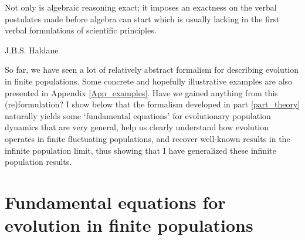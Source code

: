 \epigraph{\justifying Not only is algebraic reasoning exact; it imposes an exactness on the verbal postulates made before algebra can start which is usually lacking in the first verbal formulations of scientific principles.}{J.B.S. Haldane~\citep{haldane_defense_1964}}

So far, we have seen a lot of relatively abstract formalism for describing evolution in finite populations. Some concrete and hopefully illustrative examples are also presented in Appendix \ref{App_examples}. Have we gained anything from this (re)formulation? I show below that the formalism developed in part \ref{part_theory} naturally yields some `fundamental equations' for evolutionary population dynamics that are very general, help us clearly understand how evolution operates in finite fluctuating populations, and recover well-known results in the infinite population limit, thus showing that I have generalized these infinite population results. 

\section{Fundamental equations for evolution in finite populations}\label{sec_fun_theorems}
